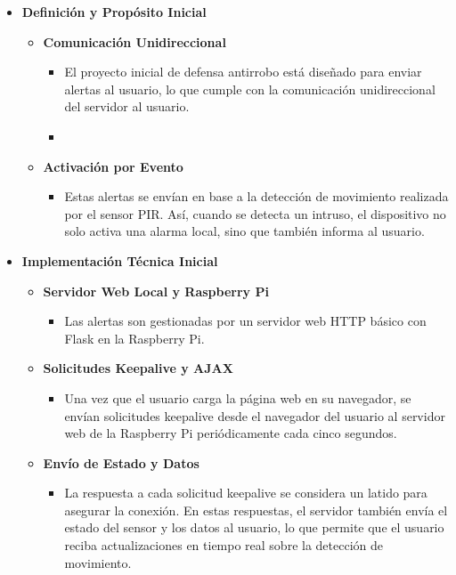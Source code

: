 \documentclass{report}
\begin{document}
\begin{itemize}
    \item \textbf{Definición y Propósito Inicial}
    \begin{itemize}
        \item \textbf{Comunicación Unidireccional}
        \begin{itemize}
            \item El proyecto inicial de defensa antirrobo está diseñado para enviar alertas al usuario, lo que cumple con la comunicación unidireccional del 
            servidor al usuario.
        \item
        \end{itemize}
        \item \textbf{Activación por Evento}
        \begin{itemize}
            \item Estas alertas se envían en base a la detección de movimiento realizada por el sensor PIR. Así, cuando se detecta un intruso, el dispositivo no 
            solo activa una alarma local, sino que también informa al usuario.
        \end{itemize}
    \end{itemize}

    \item \textbf{Implementación Técnica Inicial}
    \begin{itemize}
        \item \textbf{Servidor Web Local y Raspberry Pi}
        \begin{itemize}
            \item Las alertas son gestionadas por un servidor web HTTP básico con Flask en la Raspberry Pi. 
        \end{itemize}

        \item \textbf{Solicitudes Keepalive y AJAX}
            \begin{itemize}
                \item Una vez que el usuario carga la página web en su navegador, se envían solicitudes keepalive desde el navegador del usuario al servidor 
                web de la Raspberry Pi periódicamente cada cinco segundos.
            \end{itemize}

        \item \textbf{Envío de Estado y Datos}
        \begin{itemize}
            \item La respuesta a cada solicitud keepalive se considera un latido para asegurar la conexión. En estas respuestas, el servidor también envía 
            el estado del sensor y los datos al usuario, lo que permite que el usuario reciba actualizaciones en tiempo real sobre la detección de 
            movimiento.
        \end{itemize}


\end{itemize}
\end{itemize}
\end{document}
